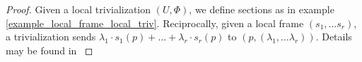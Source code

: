 \begin{proof}
    Given a local trivialization \((U, \Phi)\), we define sections as in example \ref{example_local_frame_local_triv}. Reciprocally, given a local frame \((s_1, \ldots s_r)\), a trivialization sends \(\lambda_1\cdot s_1(p) + \ldots+ \lambda_r \cdot s_r(p)\) to \((p, (\lambda_1, \ldots \lambda_r))\). Details may be found in \parencite[Prop. 10.19]{lee_introSM}

\end{proof}

